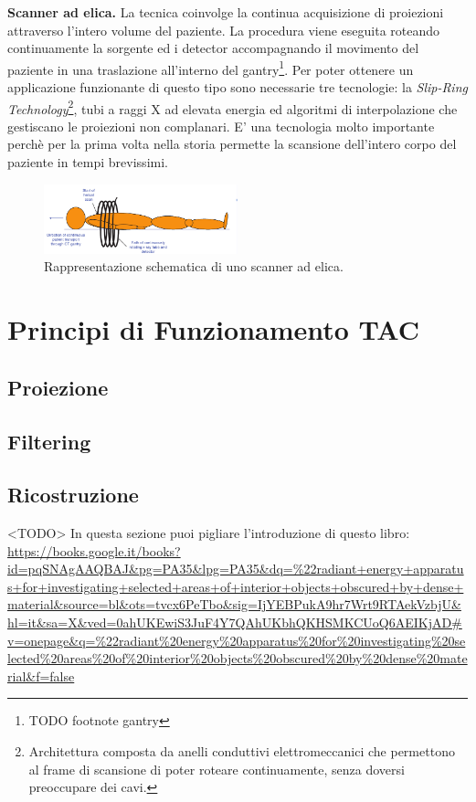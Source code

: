 \documentclass[a4paper,11pt, oneside]{article}
\begin{document}
                    \textbf{Scanner ad elica.} La tecnica coinvolge la continua acquisizione di proiezioni attraverso l’intero volume del paziente. La procedura viene eseguita roteando continuamente la sorgente ed i detector accompagnando il movimento del paziente in una traslazione all’interno del gantry\footnote{TODO footnote gantry}. Per poter ottenere un applicazione funzionante di questo tipo sono necessarie tre tecnologie: la \textit{Slip-Ring Technology}\footnote{Architettura composta da anelli conduttivi elettromeccanici che permettono al frame di scansione di poter roteare continuamente, senza doversi preoccupare dei cavi.}, tubi a raggi X ad elevata energia ed algoritmi di interpolazione che gestiscano le proiezioni non complanari. E’ una tecnologia molto importante perchè per la prima volta nella storia permette la scansione dell’intero corpo del paziente in tempi brevissimi.
    
                    \begin{figure}[h]
                        \centering
                        \includegraphics[width=0.5\textwidth]{helix}
                        \caption{Rappresentazione schematica di uno scanner ad elica.}
                        \label{fig:helix}
                    \end{figure}
                                            
        \section{Principi di Funzionamento TAC}
            \subsection{Proiezione}
            \subsection{Filtering}
            \subsection{Ricostruzione}
                <TODO>
                In questa sezione puoi pigliare l'introduzione di questo libro:
                \url{https://books.google.it/books?id=pqSNAgAAQBAJ&pg=PA35&lpg=PA35&dq=%22radiant+energy+apparatus+for+investigating+selected+areas+of+interior+objects+obscured+by+dense+material&source=bl&ots=tvcx6PeTbo&sig=IjYEBPukA9hr7Wrt9RTAekVzbjU&hl=it&sa=X&ved=0ahUKEwiS3JuF4Y7QAhUKbhQKHSMKCUoQ6AEIKjAD#v=onepage&q=%22radiant%20energy%20apparatus%20for%20investigating%20selected%20areas%20of%20interior%20objects%20obscured%20by%20dense%20material&f=false}
           
\end{document}
